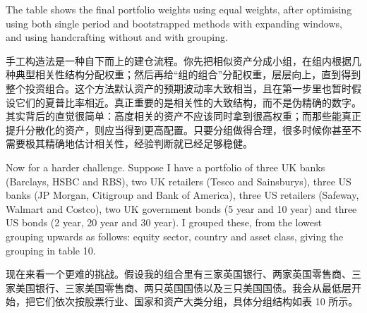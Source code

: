 \begin{englishblock} The table shows the final portfolio weights using equal weights, after optimising using both single period and bootstrapped methods with expanding windows, and using handcrafting without and with grouping. \end{englishblock}

\begin{chineseblock}手工构造法是一种自下而上的建仓流程。你先把相似资产分成小组，在组内根据几种典型相关性结构分配权重；然后再给“组的组合”分配权重，层层向上，直到得到整个投资组合。这个方法默认资产的预期波动率大致相当，且在第一步里也暂时假设它们的夏普比率相近。真正重要的是相关性的大致结构，而不是伪精确的数字。其实背后的直觉很简单：高度相关的资产不应该同时拿到很高权重；而那些能真正提升分散化的资产，则应当得到更高配置。只要分组做得合理，很多时候你甚至不需要极其精确地估计相关性，经验判断就已经足够稳健。\end{chineseblock}


\begin{englishblock} Now for a harder challenge. Suppose I have a portfolio of three UK banks (Barclays, HSBC and RBS), two UK retailers (Tesco and Sainsburys), three US banks (JP Morgan, Citigroup and Bank of America), three US retailers (Safeway, Walmart and Costco), two UK government bonds (5 year and 10 year) and three US bonds (2 year, 20 year and 30 year). I grouped these, from the lowest grouping upwards as follows: equity sector, country and asset class, giving the grouping in table 10. \end{englishblock}

\begin{chineseblock}现在来看一个更难的挑战。假设我的组合里有三家英国银行、两家英国零售商、三家美国银行、三家美国零售商、两只英国国债以及三只美国国债。我会从最低层开始，把它们依次按股票行业、国家和资产大类分组，具体分组结构如表 10 所示。\end{chineseblock}

